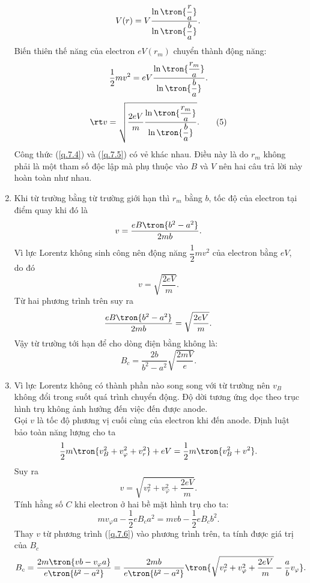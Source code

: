 \begin{loigiai}
\begin{enumerate}[1)]
    \[V(r) = V \dfrac{\ln \tron{\dfrac{r}{a}}}{\ln \tron{\dfrac{b}{a}}}.\]
    Biến thiên thế năng của electron $eV(r_m)$ chuyển thành động năng:
    \[\dfrac{1}{2}mv^2 = e  V \dfrac{\ln \tron{\dfrac{r_m}{a}}}{\ln \tron{\dfrac{b}{a}}}.\]
    \[\rt v = \sqrt{\dfrac{2eV}{m} \dfrac{\ln \tron{\dfrac{r_m}{a}}}{\ln \tron{\dfrac{b}{a}}}}.\tag{5}\label{q.7.5}\]
    Công thức (\ref{q.7.4}) và (\ref{q.7.5}) có vẻ khác nhau.   Điều này là do $r_m$ không phải là một tham số độc lập mà phụ thuộc vào $B$ và $V$ nên hai câu trả lời này hoàn toàn như nhau.
    \item Khi từ trường bằng từ trường giới hạn thì $r_m$ bằng $b$, tốc độ của electron tại điểm quay khi đó là 
    \[v = \dfrac{eB\tron{b^2 - a^2}}{2mb}.\]
    Vì lực Lorentz không sinh công nên động năng $\dfrac{1}{2}mv^2$ của electron bằng $eV$, do đó
    \[v = \sqrt{\dfrac{2eV}{m}}.\]
    Từ hai phương trình trên suy ra 
    \[\dfrac{eB\tron{b^2 - a^2}}{2mb} = \sqrt{\dfrac{2eV}{m}}. \]
    Vậy từ trường tới hạn để cho dòng điện bằng không là:
    \[B_c = \dfrac{2b}{b^2 - a^2} \sqrt{\dfrac{2mV}{e}}.\]
    \item Vì lực Lorentz không có thành phần nào song song với từ trường nên $v_B$ không đổi trong suốt quá trình chuyển động. Độ dời tương ứng dọc theo trục hình trụ không ảnh hưởng đến việc đến được anode.\\
    Gọi $v$ là tốc độ phương vị cuối cùng của electron khi đến anode. Định luật bảo toàn năng lượng cho ta 
    \[\dfrac{1}{2} m \tron{v_B^2 + v_\varphi^2 + v_r^2} + eV = \dfrac{1}{2}m \tron{v_B^2 + v^2}.\]
    Suy ra
    \[v = \sqrt{v_r^2 + v_\varphi^2 + \dfrac{2eV}{m}}.\tag{6}\label{q.7.6}\]
    Tính hằng số $C$ khi electron ở hai bề mặt hình trụ cho ta:
    \[mv_\varphi a - \dfrac{1}{2}eB_ca^2 = mvb - \dfrac{1}{2}eB_cb^2 .\]
    Thay $v$ từ phương trình (\ref{q.7.6}) vào phương trình trên, ta tính được giá trị của $B_c$
    \[B_c = \dfrac{2m\tron{vb - v_\varphi a}}{e\tron{b^2 - a^2}} = \dfrac{2mb}{e\tron{b^2 - a^2}} \tron{\sqrt{v_r^2 + v_\varphi^2 + \dfrac{2eV}{m}} - \dfrac{a}{b}v_\varphi}.\]
\end{enumerate}
\end{loigiai}


